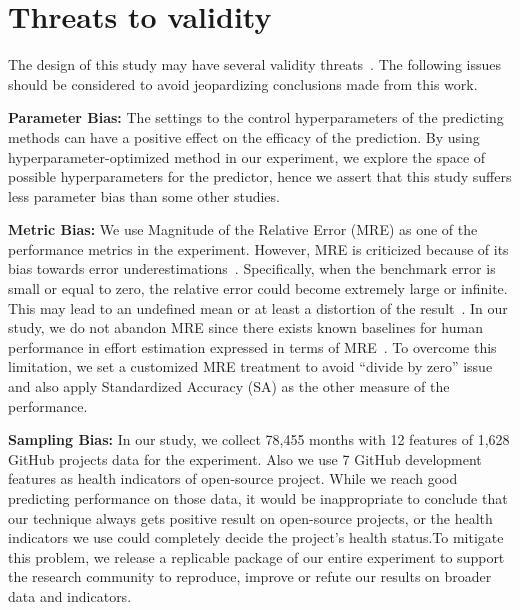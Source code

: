 \documentclass[sigconf,review,anonymous]{acmart}
\begin{document}
\section{Threats to validity}
\label{sect:threa}
The design of this study may have several validity threats~\cite{feldt2010validity}. The following issues should be considered to avoid jeopardizing conclusions made from this work.
 

\textbf{Parameter Bias:} The settings to the control hyperparameters of the predicting methods can have a positive effect on the efficacy of the prediction. By using hyperparameter-optimized method in our experiment, we explore the space of possible hyperparameters for the predictor, hence we assert that this study suffers less parameter bias than some other studies.

\textbf{Metric Bias:} We use Magnitude of the Relative Error (MRE) as one of the performance metrics in the experiment. However, MRE is criticized because of its bias towards error underestimations~\cite{foss2003simulation,kitchenham2001accuracy,korte2008confidence,port2008comparative,shepperd2000building,stensrud2003further}. Specifically, when the benchmark error is small or equal to zero, the relative error could become extremely large or infinite. This may lead to an undefined mean or at least a distortion of the result~\cite{chen2017new}. In our study, we do not abandon MRE since there exists known baselines for human performance in effort estimation expressed in terms of MRE~\cite{Jorgensen03}. To overcome this limitation, we set a customized MRE treatment to avoid ``divide by zero'' issue and also apply Standardized Accuracy (SA) as the other measure of the performance.

\textbf{Sampling Bias:} 
In our study, we collect 78,455 months with 12 features of 1,628 GitHub projects data for the experiment. Also we use 7 GitHub development features as health indicators of open-source project. While we reach good predicting performance on those data, it would be inappropriate to conclude that our technique always gets positive result on open-source projects, or the health indicators we use could completely decide the project's health status.To mitigate this problem, we release a replicable package of our entire experiment to support the research community to reproduce, improve or refute our results on broader data and indicators.

 

\end{document}
